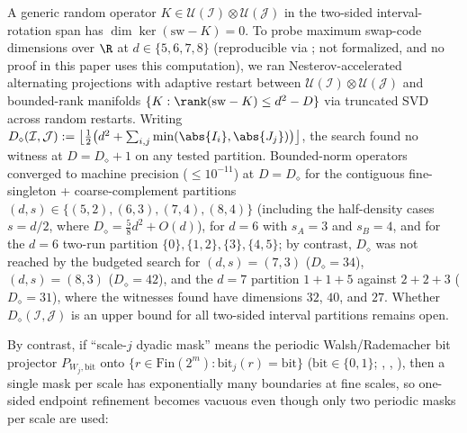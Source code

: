 \begin{remark}\label{rem:two-sided-numerical}
A generic random operator $K \in \mathcal{U}(\mathcal{I}) \otimes \mathcal{U}(\mathcal{J})$ in the
two-sided interval-rotation span has $\dim\ker(\mathrm{sw} - K) = 0$. To probe maximum swap-code
dimensions over $\R$ at $d \in \{5, 6, 7, 8\}$ (reproducible via
; not formalized, and no proof in this paper uses this
computation), we ran Nesterov-accelerated alternating projections with adaptive restart between
$\mathcal{U}(\mathcal{I}) \otimes \mathcal{U}(\mathcal{J})$ and bounded-rank manifolds
$\{K : \rank(\mathrm{sw} - K) \le d^2 - D\}$ via truncated SVD across random restarts. Writing
$D_{\diamond}(\mathcal{I}, \mathcal{J}) := \bigl\lfloor \frac{1}{2}\bigl(d^2 + \sum_{i, j}
\min(\abs{I_i}, \abs{J_j})\bigr)\bigr\rfloor$, the search found no witness at
$D = D_{\diamond} + 1$ on any tested partition. Bounded-norm operators converged to machine precision
($\le 10^{-11}$) at $D = D_{\diamond}$ for the contiguous fine-singleton + coarse-complement
partitions $(d, s) \in \{(5, 2), (6, 3), (7, 4), (8, 4)\}$ (including the half-density cases
$s = d/2$, where $D_{\diamond} = \frac{5}{8}d^2 + O(d)$), for $d = 6$ with $s_A = 3$ and $s_B = 4$,
and for the $d = 6$ two-run partition $\{0\}, \{1,2\}, \{3\}, \{4,5\}$; by contrast, $D_{\diamond}$
was not reached by the budgeted search for $(d, s) = (7, 3)$ ($D_{\diamond} = 34$), $(d, s) = (8, 3)$
($D_{\diamond} = 42$), and the $d = 7$ partition $1 + 1 + 5$ against $2 + 2 + 3$
($D_{\diamond} = 31$), where the witnesses found have dimensions $32$, $40$, and $27$. Whether
$D_{\diamond}(\mathcal{I}, \mathcal{J})$ is an upper bound for all two-sided interval partitions
remains open.
\end{remark}

By contrast, if ``scale-$j$ dyadic mask'' means the periodic Walsh/Rademacher bit projector
$P_{W_j, \mathrm{bit}}$ onto $\{r \in \mathrm{Fin}(2^m) : \mathrm{bit}_j(r) = \mathrm{bit}\}$
($\mathrm{bit} \in \{0, 1\}$; ,
, ), then a single mask per scale has
exponentially many boundaries at fine scales, so one-sided endpoint refinement becomes vacuous even
though only two periodic masks per scale are used:

